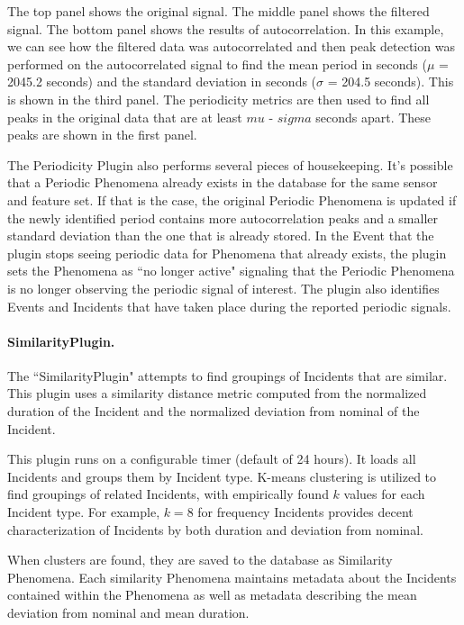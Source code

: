 The top panel shows the original signal. The middle panel shows the filtered signal. The bottom panel shows the results of autocorrelation. In this example, we can see how the filtered data was autocorrelated and then peak detection was performed on the autocorrelated signal to find the mean period in seconds ($\mu$ = 2045.2 seconds) and the standard deviation in seconds ($\sigma$ = 204.5 seconds). This is shown in the third panel. The periodicity metrics are then used to find all peaks in the original data that are at least $mu$ - $sigma$ seconds apart. These peaks are shown in the first panel.

The Periodicity Plugin also performs several pieces of housekeeping. It's possible that a Periodic Phenomena already exists in the database for the same sensor and feature set. If that is the case, the original Periodic Phenomena is updated if the newly identified period contains more autocorrelation peaks and a smaller standard deviation than the one that is already stored. In the Event that the plugin stops seeing periodic data for Phenomena that already exists, the plugin sets the Phenomena as ``no longer active" signaling that the Periodic Phenomena is no longer observing the periodic signal of interest. The plugin also identifies Events and Incidents that have taken place during the reported periodic signals.

\paragraph{SimilarityPlugin.}
The ``SimilarityPlugin" attempts to find groupings of Incidents that are similar. This plugin uses a similarity distance metric computed from the normalized duration of the Incident and the normalized deviation from nominal of the Incident.

This plugin runs on a configurable timer (default of 24 hours). It loads all Incidents and groups them by Incident type. K-means clustering is utilized to find groupings of related Incidents, with empirically found $k$ values for each Incident type. For example, $k=8$ for frequency Incidents provides decent characterization of Incidents by both duration and deviation from nominal.

When clusters are found, they are saved to the database as Similarity Phenomena. Each similarity Phenomena maintains metadata about the Incidents contained within the Phenomena as well as metadata describing the mean deviation from nominal and mean duration.

